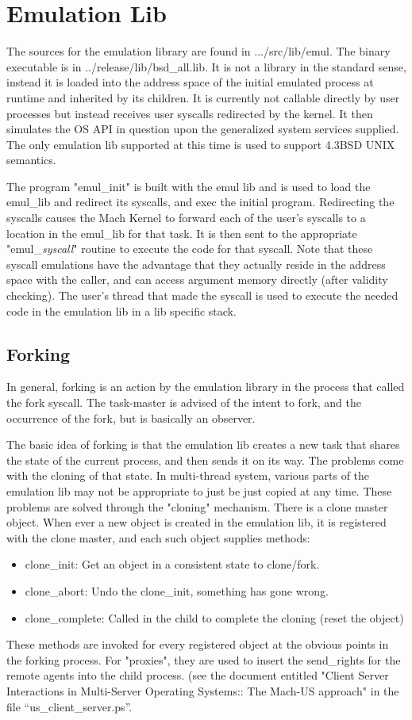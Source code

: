 \section{Emulation Lib}
The sources for the emulation library are found in .../src/lib/emul.  The
binary executable is in ../release/lib/bsd\_all.lib.
It is not a library in the
standard sense, instead it is loaded into the address space of the
initial emulated process at runtime and inherited by its children.
It is currently not callable directly by user processes but instead
receives user syscalls redirected by the kernel.
It then simulates the OS API in question
upon the generalized system services supplied.  The only emulation lib
supported at this time is used to support 4.3BSD UNIX semantics.

The program "emul\_init" is built with the emul lib and is used to load
the emul\_lib and redirect its syscalls, and exec the initial program.
Redirecting the syscalls causes the Mach Kernel to forward each of the
user's syscalls to a location in the emul\_lib for that task.  It is then
sent to the appropriate "emul\_{\em syscall}" routine to execute the code
for that syscall.  Note that these syscall emulations have the advantage that
they actually reside in the address space with the caller, and can access
argument memory directly (after validity checking).  The user's thread
that made the syscall is used to execute the needed code in the emulation
lib in a lib specific stack.

\subsection{Forking}
\label{sec:forking}
In general, forking is an action by the emulation library in the process
that called the fork syscall.  The task-master is advised of the intent to
fork, and the occurrence of the fork, but is basically an observer.

The basic idea of forking is that the emulation lib creates a new task
that shares the state of the current process, and then sends it on its way.
The problems come with the cloning of that state.  In multi-thread
system, various parts of the emulation lib may not be appropriate
to just be just copied at any time.  These problems are solved through
the "cloning" mechanism.  There is a clone master object.  When ever a
new object is created in the emulation lib, it is registered with the
clone master, and each such object supplies methods:
\begin{itemize}
\item{clone\_init}:  Get an object in a consistent state to clone/fork.
\item{clone\_abort}: Undo the clone\_init, something has gone wrong.
\item{clone\_complete}: Called in the child to complete the cloning (reset the
object)
\end{itemize}
These methods are invoked for every registered object at the obvious
points in the forking process.  For "proxies", they are used to insert
the send\_rights for the remote agents into the child process. (see
the document entitled
"Client Server Interactions in Multi-Server Operating Systems:: The Mach-US approach" in the file ``us\_client\_server.ps''.

